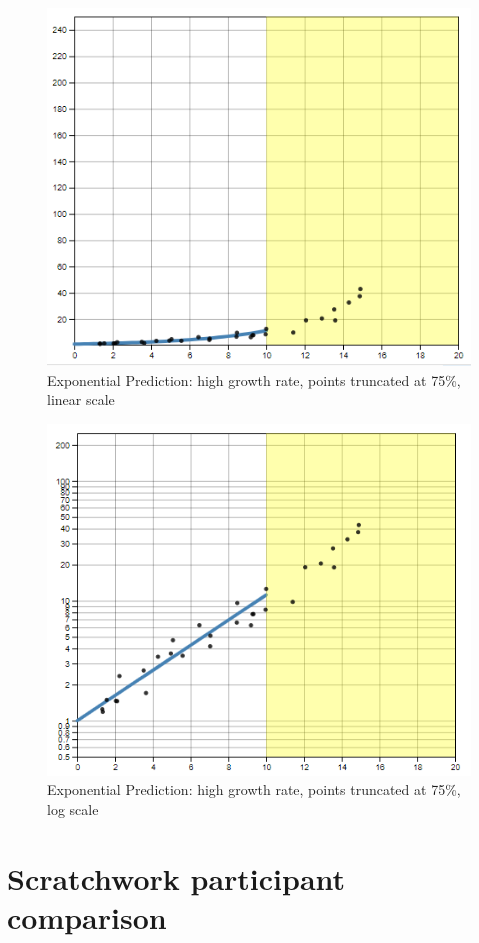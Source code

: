 \documentclass[print]{nuthesis}
\begin{document}
\begin{figure}[tbp]

{\centering \includegraphics[width=0.65\linewidth,]{images/02-you-draw-it/high-15-linear} 

}

\caption[Exponential prediction plot (high; 75\%; linear)]{Exponential Prediction: high growth rate, points truncated at 75\%, linear scale}\label{fig:high-15-linear}
\end{figure}

\begin{figure}[tbp]

{\centering \includegraphics[width=0.65\linewidth,]{images/02-you-draw-it/high-15-log} 

}

\caption[Exponential prediction plot (high; 75\%; log)]{Exponential Prediction: high growth rate, points truncated at 75\%, log scale}\label{fig:high-15-log}
\end{figure}

\hypertarget{estimation-comparison}{%
\chapter{Scratchwork participant comparison}\label{estimation-comparison}}
\end{document}
